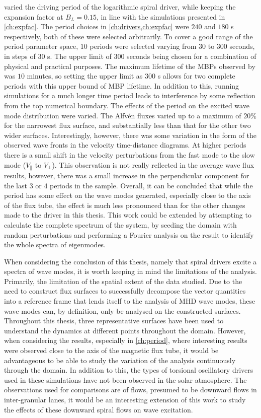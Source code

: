 \documentclass[a4paper,12pt,fourier,authoryear,custommargin]{Classes/PhDThesisPSnPDF}
\begin{document}
 varied the driving period of the logarithmic spiral driver, while keeping the expansion factor at $B_L = 0.15$, in line with the simulations presented in \cref{ch:expfac}.
The period choices in \cref{ch:drivers,ch:expfac} were $240$ and $180$ s respectively, both of these were selected arbitrarily.
To cover a good range of the period parameter space, $10$ periods were selected varying from $30$ to $300$ seconds, in steps of $30$ s.
The upper limit of $300$ seconds being chosen for a combination of physical and practical purposes.
The maximum lifetime of the MBPs observed by \cite{sanchezalmeida2004} was $10$ minutes, so setting the upper limit as $300$ s allows for two complete periods with this upper bound of MBP lifetime.
In addition to this, running simulations for a much longer time period leads to interference by some reflection from the top numerical boundary.
The effects of the period on the excited wave mode distribution were varied.
The Alfv\'en fluxes varied up to a maximum of $20$\% for the narrowest flux surface, and substantially less than that for the other two wider surfaces.
Interestingly, however, there was some variation in the form of the observed wave fronts in the velocity time-distance diagrams.
At higher periods there is a small shift in the velocity perturbations from the fast mode to the slow mode ($V_\parallel$ to $V_\perp$).
This observation is not really reflected in the average wave flux results, however, there was a small increase in the perpendicular component for the last $3$ or $4$ periods in the sample.
Overall, it can be concluded that while the period has some effect on the wave modes generated, especially close to the axis of the flux tube, the effect is much less pronounced than for the other changes made to the driver in this thesis.
This work could be extended by attempting to calculate the complete spectrum of the system, by seeding the domain with random perturbations and performing a Fourier analysis on the result to identify the whole spectra of eigenmodes. 

When considering the conclusion of this thesis, namely that spiral drivers excite a spectra of wave modes, it is worth keeping in mind the limitations of the analysis.
Primarily, the limitation of the spatial extent of the data studied.
Due to the need to construct flux surfaces to successfully decompose the vector quantities into a reference frame that lends itself to the analysis of MHD wave modes, these wave modes can, by definition, only be analysed on the constructed surfaces.
Throughout this thesis, three representative surfaces have been used to understand the dynamics at different points throughout the domain.
However, when considering the results, especially in \cref{ch:period}, where interesting results were observed close to the axis of the magnetic flux tube, it would be advantageous to be able to study the variation of the analysis continuously through the domain. 
In addition to this, the types of torsional oscillatory drivers used in these simulations have not been observed in the solar atmosphere.
The observations used for comparisons are of flows, presumed to be downward flows in inter-granular lanes, it would be an interesting extension of this work to study the effects of these downward spiral flows on wave excitation.
\end{document}
